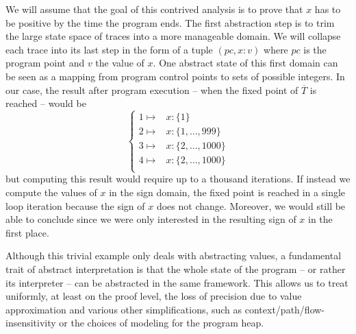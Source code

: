 \documentclass[11pt]{article}
\begin{document}
We will assume that the goal of this contrived analysis is to prove that $x$ has to be positive by the time the program ends. The first abstraction step is to trim the large state space of traces into a more manageable domain. We will collapse each trace into its last step in the form of a tuple $\left(pc,x:v\right)$ where $pc$ is the program point and $v$ the value of $x$. One abstract state of this first domain can be seen as a mapping from program control points to sets of possible integers. In our case, the result after program execution -- when the fixed point of $\overline{T}$ is reached -- would be
\[
\begin{cases}
1 \mapsto & x:\{1\} \\
2 \mapsto & x:\{1, \dots, 999\} \\
3 \mapsto & x:\{2, \dots, 1000\} \\
4 \mapsto & x:\{2, \dots, 1000\} \\
\end{cases}
\]
but computing this result would require up to a thousand iterations. If instead we compute the values of $x$ in the sign domain, the fixed point is reached in a single loop iteration because the sign of $x$ does not change. Moreover, we would still be able to conclude since we were only interested in the resulting sign of $x$ in the first place.

Although this trivial example only deals with abstracting values, a fundamental trait of abstract interpretation is that the whole state of the program -- or rather its interpreter -- can be abstracted in the same framework. This allows us to treat uniformly, at least on the proof level, the loss of precision due to value approximation and various other simplifications, such as context/path/flow-insensitivity or the choices of modeling for the program heap.
\end{document}

